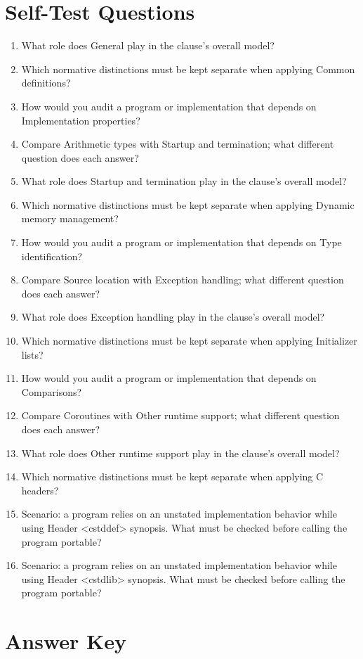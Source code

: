 \documentclass[11pt,letterpaper]{article}
\begin{document}
\section{Self-Test Questions}
\begin{enumerate}
\item What role does General play in the clause's overall model?
\item Which normative distinctions must be kept separate when applying Common definitions?
\item How would you audit a program or implementation that depends on Implementation properties?
\item Compare Arithmetic types with Startup and termination; what different question does each answer?
\item What role does Startup and termination play in the clause's overall model?
\item Which normative distinctions must be kept separate when applying Dynamic memory management?
\item How would you audit a program or implementation that depends on Type identification?
\item Compare Source location with Exception handling; what different question does each answer?
\item What role does Exception handling play in the clause's overall model?
\item Which normative distinctions must be kept separate when applying Initializer lists?
\item How would you audit a program or implementation that depends on Comparisons?
\item Compare Coroutines with Other runtime support; what different question does each answer?
\item What role does Other runtime support play in the clause's overall model?
\item Which normative distinctions must be kept separate when applying C headers?
\item Scenario: a program relies on an unstated implementation behavior while using Header <cstddef> synopsis. What must be checked before calling the program portable?
\item Scenario: a program relies on an unstated implementation behavior while using Header <cstdlib> synopsis. What must be checked before calling the program portable?
\end{enumerate}
\clearpage\section{Answer Key}
\end{document}
